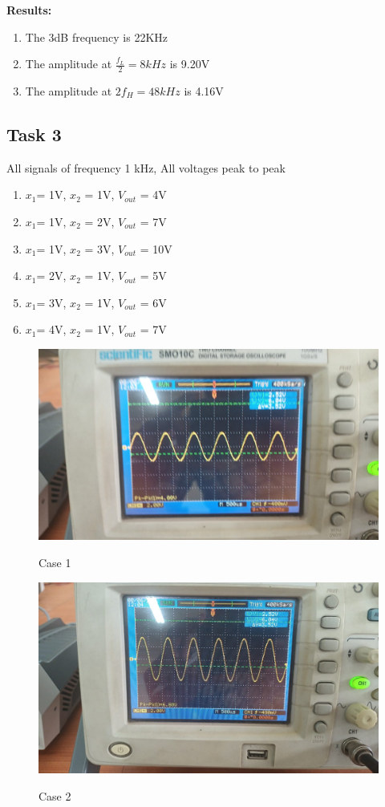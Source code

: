 \documentclass{article}
\begin{document}
\textbf{Results:}
\begin{enumerate}
  \item The 3dB frequency is 22KHz
  \item The amplitude at $\frac{f_L}{2}=8kHz$ is 9.20V
  \item The amplitude at $2f_H=48kHz$ is 4.16V

\end{enumerate}


\subsection{Task 3}
All signals of frequency 1 kHz, All voltages peak to peak
\begin{enumerate}
  \item $x_1$= 1V, $x_2$ = 1V, $V_{out}$ = 4V
  \item $x_1$= 1V, $x_2$ = 2V, $V_{out}$ = 7V
  \item  $x_1$= 1V, $x_2$ = 3V, $V_{out}$ = 10V
  \item  $x_1$= 2V, $x_2$ = 1V, $V_{out}$ = 5V
  \item  $x_1$= 3V, $x_2$ = 1V, $V_{out}$ = 6V
  \item  $x_1$= 4V, $x_2$ = 1V, $V_{out}$ = 7V
\end{enumerate}
\begin{figure}[!ht]
  \caption{Case 1}
  \includegraphics[width=\textwidth]{31.jpeg}
  \label{fig:31}
\end{figure}

\begin{figure}[!ht]
  \caption{Case 2}
  \includegraphics[width=\textwidth]{32.jpeg}
  \label{fig:32}
\end{figure}
\end{document}
